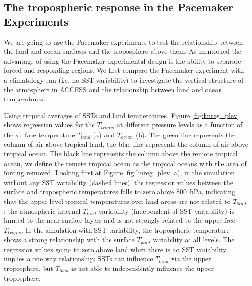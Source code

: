 \subsection{The tropospheric response in the Pacemaker Experiments}

We are going to use the Pacemaker experiments to test the relationship between 
the land and ocean surfaces and the troposphere above them. As mentioned the 
advantage of using the Pacemaker experimental design is the ability to separate 
forced and responding regions.  We first compare the Pacemaker experiment with a 
climatology run (i.e. no SST variability) to investigate the vertical structure 
of the atmosphere in ACCESS and the relationship between land and ocean 
temperatures.

Using tropical averages of SSTs and land temperatures, Figure 
\ref{fig:linreg_plev} shows regression values for the $T_{tropos}$ at different 
pressure levels as a function of the surface temperature $T_{land}$ (a) and 
$T_{ocean}$ (b). The green line represents the column of air above tropical 
land, the blue line represents the column of air above tropical ocean. The black 
line represents the column above the remote tropical ocean, we define the remote 
tropical ocean as the tropical oceans with the area of forcing removed.  Looking 
first at Figure \ref{fig:linreg_plev} a), in the simulation without any SST 
variability (dashed lines), the regression values between the surface and 
tropospheric temperatures falls to zero above \SI{800}{\hecto\pascal}, 
indicating that the upper level tropical temperatures over land areas are not 
related to $T_{land}$; the atmospheric internal $T_{land}$ variability 
(independent of SST variability) is limited to the near surface layers and is 
not strongly related to the upper free $T_{tropos}$. In the simulation with SST 
variability, the tropospheric temperature shows a strong relationship with the 
surface $T_{land}$ variability at all levels. The regression values going to 
zero above land when there is no SST variability implies a one way relationship; 
SSTs can influence $T_{land}$ via the upper troposphere, but $T_{land}$ is not 
able to independently influence the upper troposphere.

